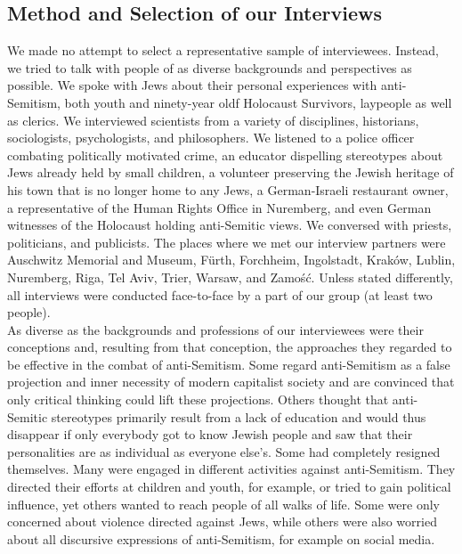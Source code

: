 \subsection*{Method and Selection of our Interviews}
We made no attempt to select a representative sample of interviewees. Instead, we tried to talk with people of as diverse backgrounds and perspectives as possible. We spoke with Jews about their personal experiences with anti-Semitism, both youth and ninety-year oldf Holocaust Survivors, laypeople as well as clerics. We interviewed scientists from a variety of disciplines, historians, sociologists, psychologists, and philosophers. We listened to a police officer combating politically motivated crime, an educator dispelling stereotypes about Jews already held by small children, a volunteer preserving the Jewish heritage of his town that is no longer home to any Jews, a German-Israeli restaurant owner, a representative of the Human Rights Office in Nuremberg, and even German witnesses of the Holocaust holding anti-Semitic views. We conversed with priests, politicians, and publicists. The places where we met our interview partners were Auschwitz Memorial and Museum, Fürth, Forchheim, Ingolstadt, Kraków, Lublin, Nuremberg, Riga, Tel Aviv, Trier, Warsaw, and Zamość. Unless stated differently, all interviews were conducted face-to-face by a part of our group (at least two people). \\
As diverse as the backgrounds and professions of our interviewees were their conceptions and, resulting from that conception, the approaches they regarded to be effective in the combat of anti-Semitism. Some regard anti-Semitism as a false projection and inner necessity of modern capitalist society and are convinced that only critical thinking could lift these projections. Others thought that anti-Semitic stereotypes primarily result from a lack of education and would thus disappear if only everybody got to know Jewish people and saw that their personalities are as individual as everyone else's. Some had completely resigned themselves. Many were engaged in different activities against anti-Semitism. They directed their efforts at children and youth, for example, or tried to gain political influence, yet others wanted to reach people of all walks of life. Some were only concerned about violence directed against Jews, while others were also worried about all discursive expressions of anti-Semitism, for example on social media. 

